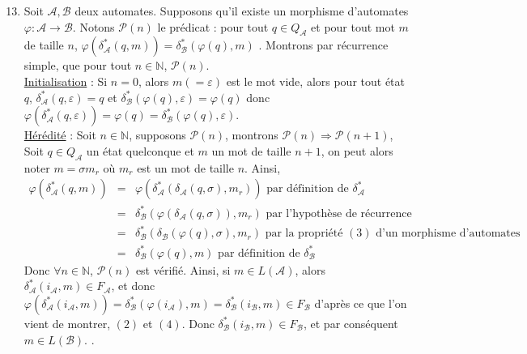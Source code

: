 \documentclass{article}
\newcommand{\bb}[1]{\mathbb{#1}}
\begin{document}
\begin{enumerate}
    \setcounter{enumi}{12}

    \item \label{itm:rec1} Soit $\mathcal{A}, \mathcal{B}$ deux automates. Supposons qu'il existe un morphisme d'automates $\varphi : \mathcal{A} \rightarrow \mathcal{B}$. \newline
    Notons $\mathcal{P}(n)$ le prédicat : \og pour tout $q \in Q_\mathcal{A}$ et pour tout mot $m$ de taille $n$, $\varphi(\delta_\mathcal{A}^*(q, m)) = \delta_\mathcal{B}^*(\varphi(q), m)$ \fg. Montrons par récurrence simple, que pour tout $n \in \bb{N}$, $\mathcal{P}(n)$. \\[2mm] 
    \underline{Initialisation} : Si $n = 0$, alors $m (= \varepsilon)$ est le mot vide, alors pour tout état $q$, \newline
    $\delta_\mathcal{A}^*(q, \varepsilon) = q$ et $\delta_\mathcal{B}^*(\varphi(q), \varepsilon) = \varphi(q)$ donc $\varphi(\delta_\mathcal{A}^*(q, \varepsilon)) = \varphi(q) = \delta_\mathcal{B}^*(\varphi(q), \varepsilon)$. \\[2mm]
    \underline{Hérédité} : Soit $n \in \bb{N}$, supposons $\mathcal{P}(n)$, montrons $\mathcal{P}(n) \Rightarrow \mathcal{P}(n + 1)$, \newline
    Soit $q \in Q_\mathcal{A}$ un état quelconque et $m$ un mot de taille $n + 1$, on peut alors noter $m = \sigma m_r$ où $m_r$ est un mot de taille $n$. Ainsi, \begin{eqnarray*}
        \varphi(\delta_\mathcal{A}^*(q, m)) & = & \varphi(\delta_\mathcal{A}^*(\delta_\mathcal{A}(q, \sigma), m_r)) \text{ par définition de } \delta^*_\mathcal{A} \\
        & = & \delta_\mathcal{B}^*(\varphi(\delta_\mathcal{A}(q, \sigma)), m_r) \text{ par l'hypothèse de récurrence} \\
        & = & \delta_\mathcal{B}^*(\delta_\mathcal{B}(\varphi(q), \sigma), m_r) \text{ par la propriété $(3)$ d'un morphisme d'automates} \\
        & = & \delta_\mathcal{B}^*(\varphi(q), m) \text{ par définition de } \delta^*_\mathcal{B} 
    \end{eqnarray*}
    Donc $\forall n \in \bb{N}$, $\mathcal{P}(n)$ est vérifié. Ainsi, si $m \in L(\mathcal{A})$, alors $\delta^*_\mathcal{A}(i_\mathcal{A}, m) \in F_\mathcal{A}$, et donc $\varphi(\delta^*_\mathcal{A}(i_\mathcal{A}, m)) = \delta_\mathcal{B}^*(\varphi(i_\mathcal{A}), m)  = \delta_\mathcal{B}^*(i_\mathcal{B}, m) \in F_\mathcal{B}$ d'après ce que l'on vient de montrer, $(2)$ et $(4)$. Donc $\delta^*_\mathcal{B}(i_\mathcal{B}, m) \in F_\mathcal{B}$, et par conséquent $m \in L(\mathcal{B})$. .

\end{enumerate}
\end{document}
